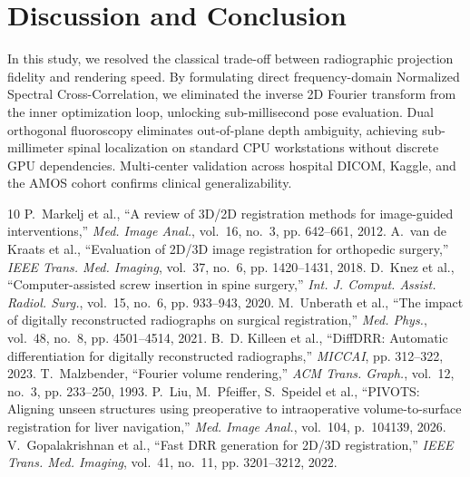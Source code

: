 \documentclass[journal,twocolumn]{IEEEtran}
\begin{document}
\section{Discussion and Conclusion}
In this study, we resolved the classical trade-off between radiographic projection fidelity and rendering speed. By formulating direct frequency-domain Normalized Spectral Cross-Correlation, we eliminated the inverse 2D Fourier transform from the inner optimization loop, unlocking sub-millisecond pose evaluation. Dual orthogonal fluoroscopy eliminates out-of-plane depth ambiguity, achieving sub-millimeter spinal localization on standard CPU workstations without discrete GPU dependencies. Multi-center validation across hospital DICOM, Kaggle, and the AMOS cohort confirms clinical generalizability.


\begin{thebibliography}{10}
P.~Markelj et al., ``A review of 3D/2D registration methods for image-guided interventions,'' \emph{Med. Image Anal.}, vol.~16, no.~3, pp. 642--661, 2012.
A.~van de Kraats et al., ``Evaluation of 2D/3D image registration for orthopedic surgery,'' \emph{IEEE Trans. Med. Imaging}, vol.~37, no.~6, pp. 1420--1431, 2018.
D.~Knez et al., ``Computer-assisted screw insertion in spine surgery,'' \emph{Int. J. Comput. Assist. Radiol. Surg.}, vol.~15, no.~6, pp. 933--943, 2020.
M.~Unberath et al., ``The impact of digitally reconstructed radiographs on surgical registration,'' \emph{Med. Phys.}, vol.~48, no.~8, pp. 4501--4514, 2021.
B.~D. Killeen et al., ``DiffDRR: Automatic differentiation for digitally reconstructed radiographs,'' \emph{MICCAI}, pp. 312--322, 2023.
T.~Malzbender, ``Fourier volume rendering,'' \emph{ACM Trans. Graph.}, vol.~12, no.~3, pp. 233--250, 1993.
P.~Liu, M.~Pfeiffer, S.~Speidel et al., ``PIVOTS: Aligning unseen structures using preoperative to intraoperative volume-to-surface registration for liver navigation,'' \emph{Med. Image Anal.}, vol.~104, p.~104139, 2026.
V.~Gopalakrishnan et al., ``Fast DRR generation for 2D/3D registration,'' \emph{IEEE Trans. Med. Imaging}, vol.~41, no.~11, pp. 3201--3212, 2022.
\end{thebibliography}
\end{document}
